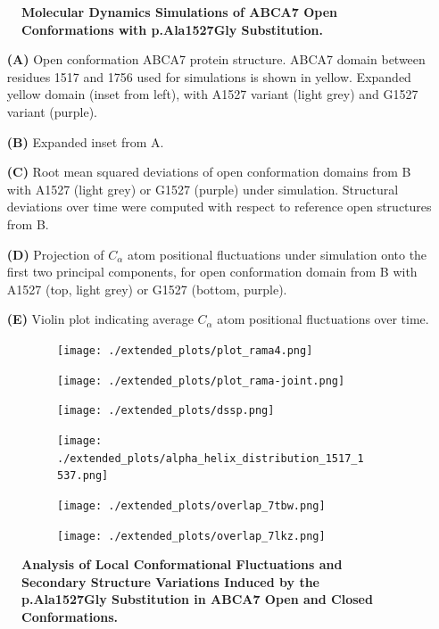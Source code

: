 \documentclass[12pt]{article}
\begin{document}
\begin{figure}[H]
\begin{subfigure}[t]{.5\textwidth}
    \end{subfigure}
    \caption{
        \textbf{Molecular Dynamics Simulations of ABCA7 Open Conformations with p.Ala1527Gly Substitution.}\\
    }
    \label{fig:md_simulations}
\end{figure}
\begin{itemize}
    \item[\textbf{(A)}] Open conformation ABCA7 protein structure. ABCA7 domain between residues 1517 and 1756 used for simulations is shown in yellow. Expanded yellow domain (inset from left), with A1527 variant (light grey) and G1527 variant (purple). 
    \item[\textbf{(B)}] Expanded inset from A. 
    \item[\textbf{(C)}] Root mean squared deviations of open conformation domains from B with A1527 (light grey) or G1527 (purple) under simulation. Structural deviations over time were computed with respect to reference open structures from B. 
    \item[\textbf{(D)}] Projection of $C_\alpha$ atom positional fluctuations under simulation onto the first two principal components, for open conformation domain from B with A1527 (top, light grey) or G1527 (bottom, purple). 
    \item[\textbf{(E)}] Violin plot indicating average $C_\alpha$ atom positional fluctuations over time. 
\end{itemize} \clearpage
\begin{figure}[H]
    \begin{subfigure}[t]{.6\textwidth}
        \caption{}
        \texttt{[image: ./extended\_plots/plot\_rama4.png]}        
    \end{subfigure}
    \begin{subfigure}[t]{.4\textwidth}
        \caption{}
        \texttt{[image: ./extended\_plots/plot\_rama-joint.png]}        
    \end{subfigure}
    \begin{subfigure}[t]{.5\textwidth}
        \caption{}
        \texttt{[image: ./extended\_plots/dssp.png]}        
    \end{subfigure}
    \begin{subfigure}[t]{.45\textwidth}
        \caption{}
        \texttt{[image: ./extended\_plots/alpha\_helix\_distribution\_1517\_1537.png]}        
    \end{subfigure}
    \begin{subfigure}[t]{.45\textwidth}
        \caption{}
        \texttt{[image: ./extended\_plots/overlap\_7tbw.png]}        
    \end{subfigure}
    \begin{subfigure}[t]{.45\textwidth}
        \caption{}
        \texttt{[image: ./extended\_plots/overlap\_7lkz.png]}        
    \end{subfigure}
    \caption{
        \textbf{Analysis of Local Conformational Fluctuations and Secondary Structure Variations Induced by the p.Ala1527Gly Substitution in ABCA7 Open and Closed Conformations.}\\
        }
        \label{fig:md_simulations_2}
    \end{figure}
\end{document}
